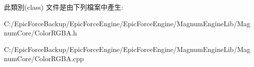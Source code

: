 此類別(class) 文件是由下列檔案中產生\+:\begin{DoxyCompactItemize}
\item 
C\+:/\+Epic\+Force\+Backup/\+Epic\+Force\+Engine/\+Epic\+Force\+Engine/\+Magnum\+Engine\+Lib/\+Magnum\+Core/Color\+R\+G\+B\+A.\+h\item 
C\+:/\+Epic\+Force\+Backup/\+Epic\+Force\+Engine/\+Epic\+Force\+Engine/\+Magnum\+Engine\+Lib/\+Magnum\+Core/Color\+R\+G\+B\+A.\+cpp\end{DoxyCompactItemize}
